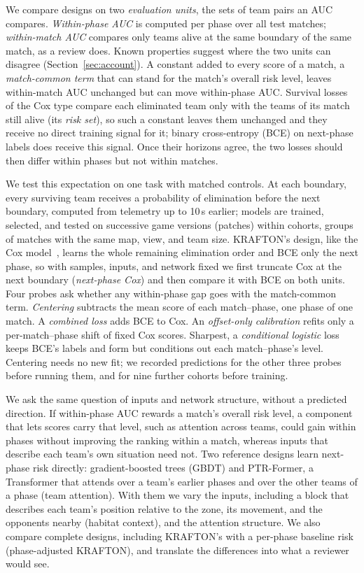 \documentclass[sigconf,anonymous]{acmart}
\begin{document}
We compare designs on two \emph{evaluation units}, the sets of team pairs an AUC compares. \emph{Within-phase AUC} is computed per phase over all test matches; \emph{within-match AUC} compares only teams alive at the same boundary of the same match, as a review does. Known properties suggest where the two units can disagree (Section~\ref{sec:account}). A constant added to every score of a match, a \emph{match-common term} that can stand for the match's overall risk level, leaves within-match AUC unchanged but can move within-phase AUC. Survival losses of the Cox type compare each eliminated team only with the teams of its match still alive (its \emph{risk set}), so such a constant leaves them unchanged and they receive no direct training signal for it; binary cross-entropy (BCE) on next-phase labels does receive this signal. Once their horizons agree, the two losses should then differ within phases but not within matches.

We test this expectation on one task with matched controls. At each boundary, every surviving team receives a probability of elimination before the next boundary, computed from telemetry up to 10\,s earlier; models are trained, selected, and tested on successive game versions (patches) within cohorts, groups of matches with the same map, view, and team size. KRAFTON's design, like the Cox model~\cite{Cox72}, learns the whole remaining elimination order and BCE only the next phase, so with samples, inputs, and network fixed we first truncate Cox at the next boundary (\emph{next-phase Cox}) and then compare it with BCE on both units. Four probes ask whether any within-phase gap goes with the match-common term. \emph{Centering} subtracts the mean score of each match--phase, one phase of one match. A \emph{combined loss} adds BCE to Cox. An \emph{offset-only calibration} refits only a per-match--phase shift of fixed Cox scores. Sharpest, a \emph{conditional logistic} loss keeps BCE's labels and form but conditions out each match--phase's level. Centering needs no new fit; we recorded predictions for the other three probes before running them, and for nine further cohorts before training.

We ask the same question of inputs and network structure, without a predicted direction. If within-phase AUC rewards a match's overall risk level, a component that lets scores carry that level, such as attention across teams, could gain within phases without improving the ranking within a match, whereas inputs that describe each team's own situation need not. Two reference designs learn next-phase risk directly: gradient-boosted trees (GBDT) and PTR-Former, a Transformer that attends over a team's earlier phases and over the other teams of a phase (team attention). With them we vary the inputs, including a block that describes each team's position relative to the zone, its movement, and the opponents nearby (habitat context), and the attention structure. We also compare complete designs, including KRAFTON's with a per-phase baseline risk (phase-adjusted KRAFTON), and translate the differences into what a reviewer would see.
\end{document}
